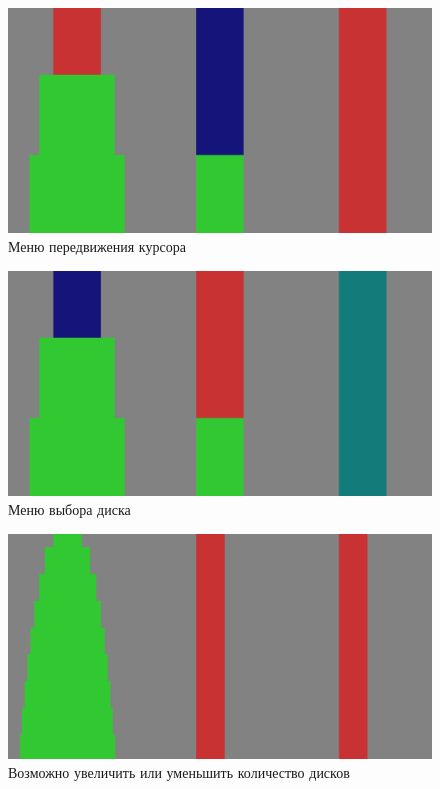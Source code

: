 \begin{figure}[H]
	\begin{center}
		\includegraphics[width=\textwidth]{images/move_mode.png}
		\caption{Меню передвижения курсора}
	\end{center}
\end{figure}
\begin{figure}[H]
	\begin{center}
		\includegraphics[width=\textwidth]{images/select_mode.png}
		\caption{Меню выбора диска}
	\end{center}
\end{figure}
\begin{figure}[H]
	\begin{center}
		\includegraphics[width=\textwidth]{images/many_disks.png}
		\caption{Возможно увеличить или уменьшить количество дисков}
	\end{center}
\end{figure}
